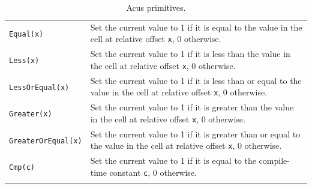 \begin{longtable}{T{0.30\textwidth}|L{0.62\textwidth}}
  \texttt{Equal(x)} & Set the current value to 1 if it is equal to the value in the cell at relative offset \texttt{x}, 0 otherwise. \\
  \texttt{Less(x)} & Set the current value to 1 if it is less than the value in the cell at relative offset \texttt{x}, 0 otherwise. \\
  \texttt{LessOrEqual(x)} & Set the current value to 1 if it is less than or equal to the value in the cell at relative offset \texttt{x}, 0 otherwise. \\
  \texttt{Greater(x)} & Set the current value to 1 if it is greater than the value in the cell at relative offset \texttt{x}, 0 otherwise. \\
  \texttt{GreaterOrEqual(x)} & Set the current value to 1 if it is greater than or equal to the value in the cell at relative offset \texttt{x}, 0 otherwise. \\
  \texttt{Cmp(c)} & Set the current value to 1 if it is equal to the compile-time constant \texttt{c}, 0 otherwise. \\
  \hline
  \caption{Acus primitives.}
  \label{tab:primitives}   
\end{longtable}


